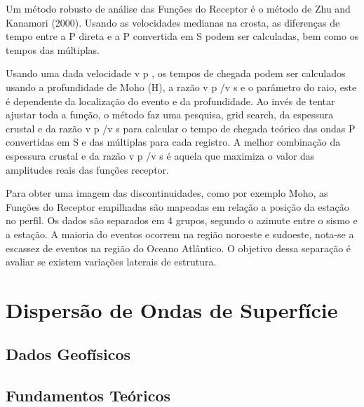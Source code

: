 Um método robusto de análise das Funções do Receptor é o método de Zhu and
Kanamori (2000). Usando as velocidades medianas na crosta, as diferenças de tempo
entre a P direta e a P convertida em S podem ser calculadas, bem como os tempos das
múltiplas.

Usando uma dada velocidade v p , os tempos de chegada podem ser calculados usando
a profundidade de Moho (H), a razão v p /v s e o parâmetro do raio, este é dependente
da localização do evento e da profundidade. Ao invés de tentar ajustar toda a função, o
método faz uma pesquisa, grid search, da espessura crustal e da razão v p /v s para calcular o
tempo de chegada teórico das ondas P convertidas em S e das múltiplas para cada registro.
A melhor combinação da espessura crustal e da razão v p /v s é aquela que maximiza o valor
das amplitudes reais das funções receptor.

Para obter uma imagem das discontinuidades, como por exemplo Moho, as Funções do
Receptor empilhadas são mapeadas em relação a posição da estação no perfil. Os dados
são separados em 4 grupos, segundo o azimute entre o sismo e a estação. A maioria do
eventos ocorrem na região noroeste e sudoeste, nota-se a escassez de eventos na região do
Oceano Atlântico. O objetivo dessa separação é avaliar se existem variações laterais de
estrutura.




\section*{Dispersão de Ondas de Superfície}
\subsection*{Dados Geofísicos}
\subsection*{Fundamentos Teóricos}